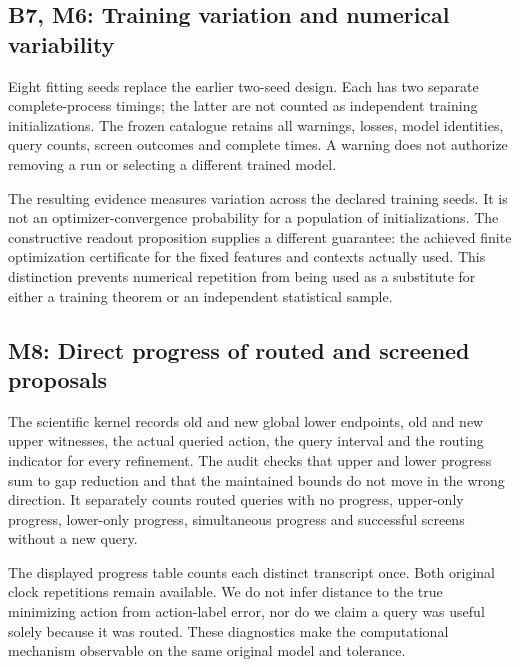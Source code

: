 \documentclass[ecta,nameyear,draft]{econsocart}
\begin{document}
\hypertarget{b7-m6-training-variation-and-numerical-variability}{%
\subsection{B7, M6: Training variation and numerical
variability}\label{b7-m6-training-variation-and-numerical-variability}}

Eight fitting seeds replace the earlier two-seed design. Each has two
separate complete-process timings; the latter are not counted as
independent training initializations. The frozen catalogue retains all
warnings, losses, model identities, query counts, screen outcomes and
complete times. A warning does not authorize removing a run or selecting
a different trained model.

The resulting evidence measures variation across the declared training
seeds. It is not an optimizer-convergence probability for a population
of initializations. The constructive readout proposition supplies a
different guarantee: the achieved finite optimization certificate for
the fixed features and contexts actually used. This distinction prevents
numerical repetition from being used as a substitute for either a
training theorem or an independent statistical sample.

\hypertarget{m8-direct-progress-of-routed-and-screened-proposals}{%
\subsection{M8: Direct progress of routed and screened
proposals}\label{m8-direct-progress-of-routed-and-screened-proposals}}

The scientific kernel records old and new global lower endpoints, old
and new upper witnesses, the actual queried action, the query interval
and the routing indicator for every refinement. The audit checks that
upper and lower progress sum to gap reduction and that the maintained
bounds do not move in the wrong direction. It separately counts routed
queries with no progress, upper-only progress, lower-only progress,
simultaneous progress and successful screens without a new query.

The displayed progress table counts each distinct transcript once. Both
original clock repetitions remain available. We do not infer distance to
the true minimizing action from action-label error, nor do we claim a
query was useful solely because it was routed. These diagnostics make
the computational mechanism observable on the same original model and
tolerance.
\end{document}

